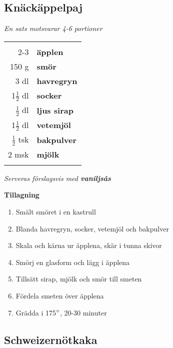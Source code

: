\documentclass[a4paper,12pt]{article}
\newcommand{\tillb}[1]{\noindent \textit{Serveras förslagsvis med \textbf{#1}} \vspace{1cm}}
\newcommand{\sats}[1]{\noindent \textit{En sats motsvarar #1}}
\begin{document}
\clearpage

\subsection{Knäckäppelpaj}
\sats{4-6 portioner}

\begin{table}[H]
	\begin{tabular}{rl}
	\hline
	&\\
		2-3 & \textbf{äpplen}\\
		150 g & \textbf{smör}\\
		3 dl & \textbf{havregryn}\\
		1$\frac{1}{2}$ dl & \textbf{socker}\\
		$\frac{1}{2}$ dl & \textbf{ljus sirap}\\
		1$\frac{1}{2}$ dl & \textbf{vetemjöl}\\
		$\frac{1}{2}$ tsk & \textbf{bakpulver}\\
		2 msk & \textbf{mjölk}\\
	&\\
	\hline
	\end{tabular}
\end{table}

\tillb{vaniljsås}

\begin{multicols*}{2}

\noindent \textbf{Tillagning}
\begin{enumerate}
	\itemsep0cm
	\item Smält smöret i en kastrull
	\item Blanda havregryn, socker, vetemjöl och bakpulver
	\item Skala och kärna ur äpplena, skär i tunna skivor
	\item Smörj en glasform och lägg i äpplena
	\item Tillsätt sirap, mjölk och smör till smeten
	\item Fördela smeten över äpplena
	\item Grädda i 175$\degree$, 20-30 \mbox{minuter}
\end{enumerate}

\end{multicols*}

\clearpage
\subsection{Schweizernötkaka}
\end{document}

